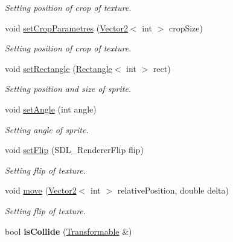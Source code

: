\begin{DoxyCompactItemize}
\begin{DoxyCompactList}\small\item\em Setting position of crop of texture. \end{DoxyCompactList}\item 
void \hyperlink{class_virtual_1_1_transformable_a558026b1336c4f24c2bc70debc01800c}{set\+Crop\+Parametres} (\hyperlink{struct_virtual_1_1_vector2}{Vector2}$<$ int $>$ crop\+Size)
\begin{DoxyCompactList}\small\item\em Setting position of crop of texture. \end{DoxyCompactList}\item 
void \hyperlink{class_virtual_1_1_transformable_ad86a98728222a2b879afa41ba27dfc58}{set\+Rectangle} (\hyperlink{struct_virtual_1_1_rectangle}{Rectangle}$<$ int $>$ rect)
\begin{DoxyCompactList}\small\item\em Setting position and size of sprite. \end{DoxyCompactList}\item 
void \hyperlink{class_virtual_1_1_transformable_ae7305c3fe8a7bd9f4a1138a9d097bfab}{set\+Angle} (int angle)
\begin{DoxyCompactList}\small\item\em Setting angle of sprite. \end{DoxyCompactList}\item 
void \hyperlink{class_virtual_1_1_transformable_a4d0e9c61931af6b42fac1dc0c3a1ed21}{set\+Flip} (S\+D\+L\+\_\+\+Renderer\+Flip flip)
\begin{DoxyCompactList}\small\item\em Setting flip of texture. \end{DoxyCompactList}\item 
void \hyperlink{class_virtual_1_1_transformable_a80eb3848090682f3ad3bd3faf879f6ab}{move} (\hyperlink{struct_virtual_1_1_vector2}{Vector2}$<$ int $>$ relative\+Position, double delta)
\begin{DoxyCompactList}\small\item\em Setting flip of texture. \end{DoxyCompactList}\item 
\hypertarget{class_virtual_1_1_transformable_a997867ac2fabb95a7244caeeb26d8b05}{}\label{class_virtual_1_1_transformable_a997867ac2fabb95a7244caeeb26d8b05} 
bool {\bfseries is\+Collide} (\hyperlink{class_virtual_1_1_transformable}{Transformable} \&)
\end{DoxyCompactItemize}
